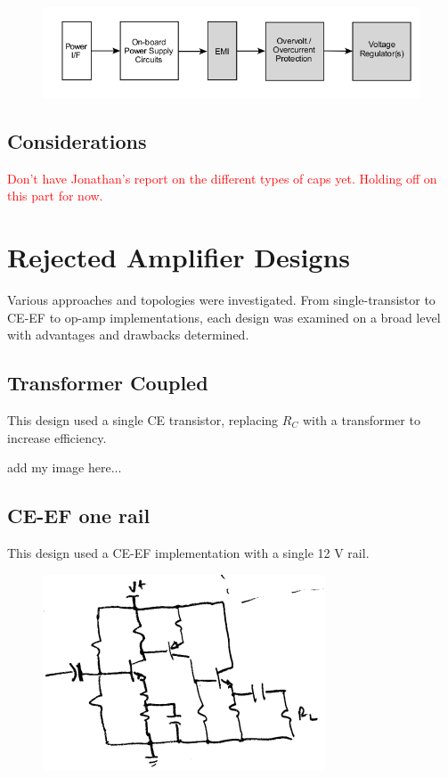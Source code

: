 \documentclass[journal]{IEEEtran}
\begin{document}
\begin{figure}[H]
\centering
\includegraphics[scale=.35]{psu-block.png}
\label{fig_psu_block}
\end{figure}

\subsection{Considerations}

\textcolor{red}{Don't have Jonathan's report on the different types of caps yet. Holding off on this part for now.}

\section{Rejected Amplifier Designs}

Various approaches and topologies were investigated. From single-transistor to CE-EF to op-amp implementations, each design was examined on a broad level with advantages and drawbacks determined.

\subsection{Transformer Coupled}

This design used a single CE transistor, replacing $R_{C}$ with a transformer to increase efficiency.

add my image here...

\subsection{CE-EF one rail}

This design used a CE-EF implementation with a single 12 V rail.
\begin{figure}[H]
\centering
\includegraphics[scale=.4]{reject-2.png}
\label{fig_reject_2}
\end{figure}
\end{document}
